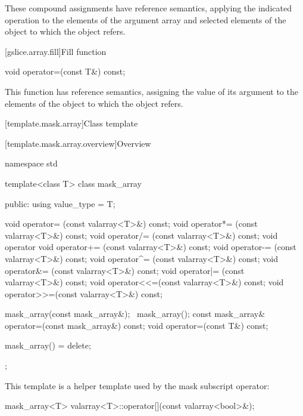 \begin{itemdescr}
\pnum
These compound assignments have reference semantics, applying the
indicated operation to the elements of the argument array and selected
elements of the
object to which the
object refers.
\end{itemdescr}

[gslice.array.fill]{Fill function}

%
\begin{itemdecl}
void operator=(const T&) const;
\end{itemdecl}

\begin{itemdescr}
\pnum
This function has reference semantics, assigning the value of its argument
to the elements of the
object to which the
object refers.
\end{itemdescr}

[template.mask.array]{Class template }

[template.mask.array.overview]{Overview}

%
%
\begin{codeblock}
namespace std {
  template<class T> class mask_array {
  public:
    using value_type = T;

    void operator=  (const valarray<T>&) const;
    void operator*= (const valarray<T>&) const;
    void operator/= (const valarray<T>&) const;
    void operator%
    void operator+= (const valarray<T>&) const;
    void operator-= (const valarray<T>&) const;
    void operator^= (const valarray<T>&) const;
    void operator&= (const valarray<T>&) const;
    void operator|= (const valarray<T>&) const;
    void operator<<=(const valarray<T>&) const;
    void operator>>=(const valarray<T>&) const;

    mask_array(const mask_array&);
    ~mask_array();
    const mask_array& operator=(const mask_array&) const;
    void operator=(const T&) const;

    mask_array() = delete;
  };
}
\end{codeblock}

\pnum
This template is a helper template used by the mask subscript operator:

%
\begin{itemdecl}
mask_array<T> valarray<T>::operator[](const valarray<bool>&);
\end{itemdecl}

